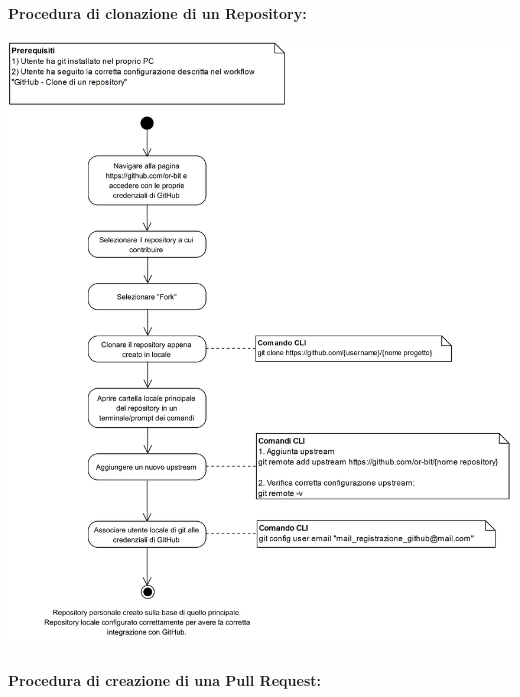 \paragraph{Procedura di clonazione di un Repository:}

\begin{center}
\includegraphics[width=15cm]{./DiagrammiProcedure/GitHub-CloneDiUnRepository.png}
\end{center}

\paragraph{Procedura di creazione di una Pull Request:}

